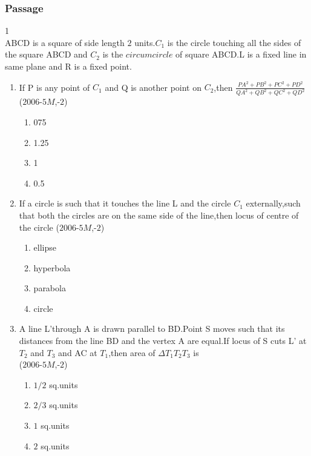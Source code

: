 \documentclass[journal,12pt,twocolumn]{IEEEtran}
\theoremstyle{remark}
\begin{document}
\subsubsection{Passage }
1\\
ABCD is a square of side length $2$ units.$C_1$ is the circle touching all the sides of the square ABCD and $C_2$ is the $circumcircle$ of square ABCD.L is a fixed line in same plane and R is a fixed point.\\
\begin{enumerate}
\item If P is any point of $C_1$ and Q is another point on $C_2$,then $\frac{PA^2+PB^2+PC^2+PD^2}{QA^2+QB^2+QC^2+QD^2}$\\
\hfill ($2006$-$5M$,-$2$)\\
\begin{enumerate}
\item 075\\
\item 1.25\\
\item 1\\
\item 0.5\\
\end{enumerate}
\item If a circle is such that it touches the line L and the circle $C_1$ externally,such that both the circles are on the same side of the line,then locus of centre of the circle 
\hfill($2006$-$5M$,-$2$)
\begin{enumerate}
\item ellipse\\
\item hyperbola\\
\item parabola\\
\item circle\\
\end{enumerate}
\item A line L'through A is drawn parallel to BD.Point S moves such that its distances from the line BD and the vertex A are equal.If locus of S cuts L' at $T_2$ and $T_3$ and AC at $T_1$,then area of $\Delta T_1T_2T_3$ is\\
\hfill($2006$-$5M$,-$2$)\\
\begin{enumerate}
\item $1/2$ sq.units\\
\item $2/3$ sq.units\\
\item $1$ sq.units\\
\item $2$ sq.units\\
\end{enumerate}
\end{enumerate}
\end{document}
